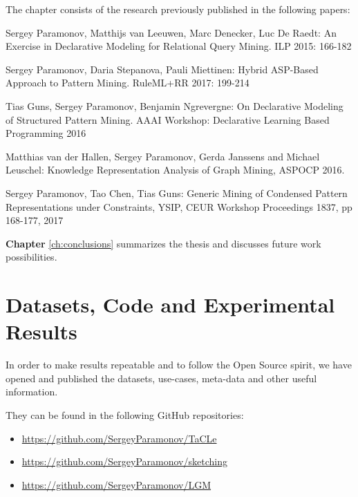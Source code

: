 The chapter consists of the research previously published in the following papers:
\begin{addmargin}[2em]{2em}
Sergey Paramonov, Matthijs van Leeuwen, Marc Denecker, Luc De Raedt:
An Exercise in Declarative Modeling for Relational Query Mining. ILP
2015: 166-182


Sergey Paramonov, Daria Stepanova, Pauli Miettinen:
Hybrid ASP-Based Approach to Pattern Mining. RuleML+RR 2017: 199-214


Tias Guns, Sergey Paramonov, Benjamin Ngrevergne:  On Declarative Modeling of Structured Pattern Mining. AAAI Workshop:
  Declarative Learning Based Programming 2016

Matthias van der Hallen, Sergey Paramonov, Gerda Janssens and
  Michael Leuschel:   Knowledge Representation Analysis of Graph
  Mining, ASPOCP 2016.

Sergey Paramonov, Tao Chen, Tias Guns: Generic Mining of Condensed
Pattern Representations under Constraints, YSIP, CEUR Workshop
Proceedings 1837, pp 168-177, 2017

\end{addmargin}

\textbf{Chapter} \ref{ch:conclusions} summarizes the thesis and
discusses future work possibilities.

\section{Datasets, Code and Experimental Results}
In order to make results repeatable and to follow the Open Source
spirit, we have opened and published the datasets, use-cases,
meta-data and other useful information.

They can be found in the following GitHub repositories:
\begin{itemize}
\item \url{https://github.com/SergeyParamonov/TaCLe}
\item \url{https://github.com/SergeyParamonov/sketching}
\item \url{https://github.com/SergeyParamonov/LGM}
\end{itemize}
\cleardoublepage
